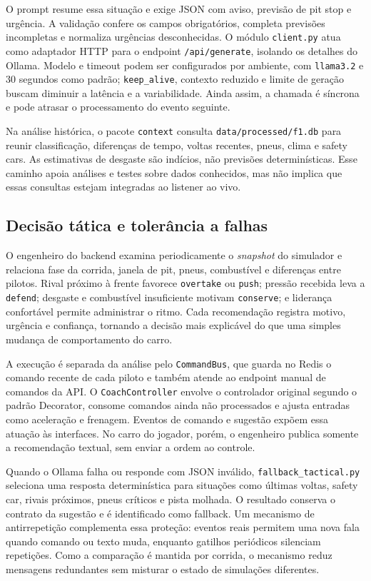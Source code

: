 O prompt resume essa situação e exige JSON com aviso, previsão de pit stop e urgência. A validação confere os campos obrigatórios, completa previsões incompletas e normaliza urgências desconhecidas. O módulo \texttt{client.py} atua como adaptador HTTP para o endpoint \texttt{/api/generate}, isolando os detalhes do Ollama. Modelo e timeout podem ser configurados por ambiente, com \texttt{llama3.2} e 30 segundos como padrão; \texttt{keep\_alive}, contexto reduzido e limite de geração buscam diminuir a latência e a variabilidade. Ainda assim, a chamada é síncrona e pode atrasar o processamento do evento seguinte.

Na análise histórica, o pacote \texttt{context} consulta \texttt{data/processed/f1.db} para reunir classificação, diferenças de tempo, voltas recentes, pneus, clima e safety cars. As estimativas de desgaste são indícios, não previsões determinísticas. Esse caminho apoia análises e testes sobre dados conhecidos, mas não implica que essas consultas estejam integradas ao listener ao vivo.

\subsection{Decisão tática e tolerância a falhas}

O engenheiro do backend examina periodicamente o \textit{snapshot} do simulador e relaciona fase da corrida, janela de pit, pneus, combustível e diferenças entre pilotos. Rival próximo à frente favorece \texttt{overtake} ou \texttt{push}; pressão recebida leva a \texttt{defend}; desgaste e combustível insuficiente motivam \texttt{conserve}; e liderança confortável permite administrar o ritmo. Cada recomendação registra motivo, urgência e confiança, tornando a decisão mais explicável do que uma simples mudança de comportamento do carro.

A execução é separada da análise pelo \texttt{CommandBus}, que guarda no Redis o comando recente de cada piloto e também atende ao endpoint manual de comandos da API. O \texttt{CoachController} envolve o controlador original segundo o padrão Decorator, consome comandos ainda não processados e ajusta entradas como aceleração e frenagem. Eventos de comando e sugestão expõem essa atuação às interfaces. No carro do jogador, porém, o engenheiro publica somente a recomendação textual, sem enviar a ordem ao controle.

Quando o Ollama falha ou responde com JSON inválido, \texttt{fallback\_tactical.py} seleciona uma resposta determinística para situações como últimas voltas, safety car, rivais próximos, pneus críticos e pista molhada. O resultado conserva o contrato da sugestão e é identificado como fallback. Um mecanismo de antirrepetição complementa essa proteção: eventos reais permitem uma nova fala quando comando ou texto muda, enquanto gatilhos periódicos silenciam repetições. Como a comparação é mantida por corrida, o mecanismo reduz mensagens redundantes sem misturar o estado de simulações diferentes.

